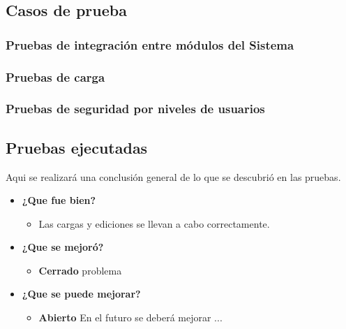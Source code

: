 \documentclass[a4paper,12pt]{article}
\begin{document}

\subsection{Casos de prueba}

\subsubsection{Pruebas  de  integración  entre módulos del Sistema}

\subsubsection{ Pruebas de carga}

\subsubsection{ Pruebas de seguridad por niveles de usuarios}


\subsection{Pruebas ejecutadas}
Aqui se realizará una conclusión general de lo que se descubrió en las pruebas.
	\begin{itemize}
		\item \textbf{¿Que fue bien?}
        	\begin{itemize}
				\item        Las cargas y ediciones se llevan a cabo correctamente.
			\end{itemize}

   		\item \textbf{¿Que se mejoró?}
        	\begin{itemize}
                \item \textbf{Cerrado} problema
			\end{itemize}

   		\item \textbf{¿Que se puede mejorar?}
        	\begin{itemize}
		        \item \textbf{Abierto} En el futuro se deberá mejorar ...
            \end{itemize}
        

	\end{itemize}
\end{document}
